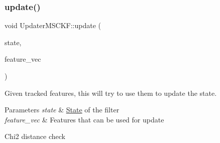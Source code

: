 \subsubsection{\texorpdfstring{update()}{update()}}
{\footnotesize\ttfamily void Updater\+M\+S\+C\+K\+F\+::update (\begin{DoxyParamCaption}\item[{std\+::shared\+\_\+ptr$<$ \hyperlink{classov__msckf_1_1State}{State} $>$}]{state,  }\item[{std\+::vector$<$ std\+::shared\+\_\+ptr$<$ \hyperlink{classov__core_1_1Feature}{ov\+\_\+core\+::\+Feature} $>$$>$ \&}]{feature\+\_\+vec }\end{DoxyParamCaption})}



Given tracked features, this will try to use them to update the state. 


\begin{DoxyParams}{Parameters}
{\em state} & \hyperlink{classov__msckf_1_1State}{State} of the filter \\
\hline
{\em feature\+\_\+vec} & Features that can be used for update \\
\hline
\end{DoxyParams}
Chi2 distance check 